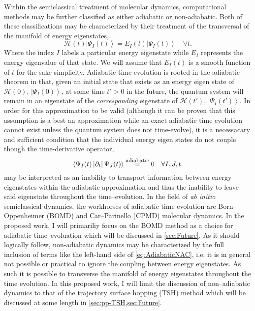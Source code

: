 \documentclass[12pt]{article}
\newcommand{\ket}[1]{\left\vert #1 \right\rangle}         %
\newcommand{\innerop}[3]{\left\langle #1 \left\vert #2 \right\vert #3 \right\rangle}  %
\begin{document}
Within the semiclassical treatment of molecular dynamics, computational methods
may be further classified as either adiabatic or non-adiabatic. Both of these
classifications may be characterized by their treatment of the transversal of
the manifold of energy eigenstates,
\begin{equation}
\mathscr{H}(t) \ket{\Psi_I (t)} = E_I(t) \ket{\Psi_I (t)}
\quad \forall t.
\label{eq:EnergyEig}
\end{equation}
Where the index $I$ labels a particular energy eigenstate while $E_I$ represents
the energy eigenvalue of that state. We will assume that $E_I(t)$ is a smooth
function of $t$ for the sake simplicity. Adiabatic time evolution is rooted in
the adiabatic theorem in that, given an initial state that exists as an energy
eigen state of $\mathscr{H}(0)$, $\ket{\Psi_I(0)}$, at some time $t' > 0$ in the
future, the quantum system will remain in an eigenstate of the
\emph{corresponding} eigenstate of $\mathscr{H}(t')$, $\ket{\Psi_I(t')}$. In
order for this approximation to be valid (although it can be proven that this
assumption is a best an approximation while an exact adiabatic time evolution
cannot exist unless the quantum system does not time-evolve), it is a
necessacary and sufficient condition that the individual energy eigen states do
not couple though the time-derivative operator,
\begin{equation}
\innerop{\Psi_I(t)}{\partial_t}{\Psi_J (t)}
  \stackrel{\mathrm{\mbox{\footnotesize adiabatic}}}{=} 0
  \quad \forall I,J,t.
  \label{eq:AdiabaticNAC}
\end{equation}
 may be interpreted as an inability to transport
information between energy eigenstates within the adiabatic approximation and
thus the inability to leave said eigenstate throughout the time--evolution.  In
the field of \emph{ab initio} semiclassical dynamics, the workhorses of
adiabatic time evolution are Born--Oppenheimer  (BOMD) and Car--Parinello (CPMD)
molecular dynamics. In the proposed work, I will primariliy focus on the BOMD
method as a choice for adiabatic time--evoluation which will be discussed in
\cref{sec:Future}.  As it should logically follow, non-adiabatic dynamics may be
characterized by the full inclusion of terms like the left-hand side of
\cref{eq:AdiabaticNAC}, i.e.  it is in general not possible or practical to
ignore the coupling between energy eigenstates. As such it is possible to
transverse the manifold of energy eigenstates throughout the time evolution.
In this proposed work, I will limit the discussion of non--adiabatic dynamics to
that of the trajectory surface hopping (TSH) method which will be discussed at
some length in \cref{sec:pp-TSH,sec:Future}.
\end{document}
